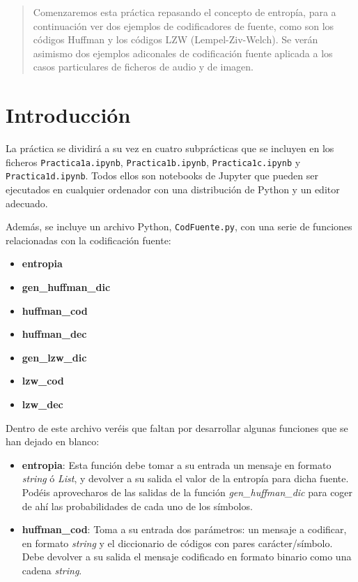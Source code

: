 \documentclass[es,practica]{uah}
\begin{document}

\maketitle

\begin{abstract}
Comenzaremos esta práctica repasando el concepto de entropía, para a continuación ver dos ejemplos de codificadores de fuente, como son los códigos Huffman y los códigos LZW (Lempel-Ziv-Welch). Se verán asimismo dos ejemplos adiconales de codificación fuente aplicada a los casos particulares de ficheros de audio y de imagen. 
\end{abstract}

\section{Introducción}

La práctica se dividirá a su vez en cuatro subprácticas que se incluyen en los ficheros \texttt{Practica1a.ipynb}, \texttt{Practica1b.ipynb}, \texttt{Practica1c.ipynb} y \texttt{Practica1d.ipynb}. Todos ellos son notebooks de Jupyter que pueden ser ejecutados en cualquier ordenador con una distribución de Python y un editor adecuado. 

Además, se incluye un archivo Python, \texttt{CodFuente.py}, con una serie de funciones relacionadas con la codificación fuente:
\begin{itemize}
	\item {\bf entropia}
	\item {\bf gen_huffman_dic}
	\item {\bf huffman\_cod}
	\item {\bf huffman\_dec}
	\item {\bf gen_lzw_dic}
	\item {\bf lzw\_cod}
	\item {\bf lzw\_dec}
\end{itemize}


Dentro de este archivo veréis que faltan por desarrollar algunas funciones que se han dejado en blanco:
\begin{itemize}
	\item {\bf entropia}: Esta función debe tomar a su entrada un mensaje en formato \emph{string} ó \emph{List}, y devolver a su salida el valor de la entropía para dicha fuente. Podéis aprovecharos de las salidas de la función \emph{gen\_huffman\_dic} para coger de ahí las probabilidades de cada uno de los símbolos.
	\item {\bf huffman\_cod}: Toma a su entrada dos parámetros: un mensaje a codificar, en formato \emph{string} y el diccionario de códigos con pares carácter/símbolo. Debe devolver a su salida el mensaje codificado en formato binario como una cadena \emph{string}.
\end{itemize}
\end{document}
